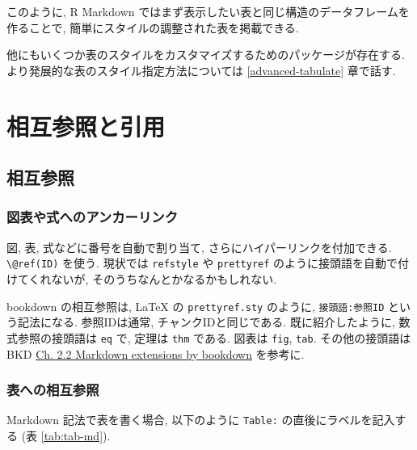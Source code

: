 \documentclass[
]{bxjsbook}
\theoremstyle{definition}
\theoremstyle{definition}
\theoremstyle{definition}
\theoremstyle{remark}
\begin{document}
このように, R Markdown
ではまず表示したい表と同じ構造のデータフレームを作ることで,
簡単にスタイルの調整された表を掲載できる.

他にもいくつか表のスタイルをカスタマイズするためのパッケージが存在する.
より発展的な表のスタイル指定方法については \ref{advanced-tabulate}
章で話す.

\hypertarget{ux76f8ux4e92ux53c2ux7167ux3068ux5f15ux7528}{%
\chapter{相互参照と引用}\label{ux76f8ux4e92ux53c2ux7167ux3068ux5f15ux7528}}

\hypertarget{crossref}{%
\section{相互参照}\label{crossref}}

\hypertarget{ux56f3ux8868ux3084ux5f0fux3078ux306eux30a2ux30f3ux30abux30fcux30eaux30f3ux30af}{%
\subsection{図表や式へのアンカーリンク}\label{ux56f3ux8868ux3084ux5f0fux3078ux306eux30a2ux30f3ux30abux30fcux30eaux30f3ux30af}}

図, 表, 式などに番号を自動で割り当て, さらにハイパーリンクを付加できる.
\texttt{\textbackslash{}@ref(ID)} を使う. 現状では \texttt{refstyle} や
\texttt{prettyref} のように接頭語を自動で付けてくれないが,
そのうちなんとかなるかもしれない.

bookdown の相互参照は, LaTeX の \texttt{prettyref.sty} のように,
\texttt{接頭語:参照ID} という記法になる. 参照IDは通常,
チャンクIDと同じである. 既に紹介したように, 数式参照の接頭語は
\texttt{eq} で, 定理は \texttt{thm} である. 図表は \texttt{fig},
\texttt{tab}. その他の接頭語は BKD
\href{https://bookdown.org/yihui/bookdown/markdown-extensions-by-bookdown.html\#equations}{Ch.
2.2 Markdown extensions by bookdown} を参考に.

\hypertarget{ux8868ux3078ux306eux76f8ux4e92ux53c2ux7167}{%
\subsection{表への相互参照}\label{ux8868ux3078ux306eux76f8ux4e92ux53c2ux7167}}

Markdown 記法で表を書く場合, 以下のように \texttt{Table:}
の直後にラベルを記入する (表 \ref{tab:tab-md}).
\end{document}
